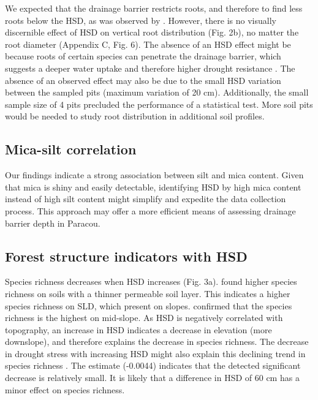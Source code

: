 \documentclass[fleqn,11pt]{latex/stylish_article} %
\begin{document}
We expected that the drainage barrier restricts roots, and therefore to find less roots below the HSD, as was observed by \citet{humbelCaracterisationParMesures1978}. However, there is no visually discernible effect of HSD on vertical root distribution (Fig. 2b), no matter the root diameter (Appendix C, Fig. 6). The absence of an HSD effect might be because roots of certain species can penetrate the drainage barrier, which suggests a deeper water uptake and therefore higher drought resistance \citep{ferryGeneseFonctionnementHydrique2003}. The absence of an observed effect may also be due to the small HSD variation between the sampled pits (maximum variation of 20 cm). Additionally, the small sample size of 4 pits precluded the performance of a statistical test. More soil pits would be needed to study root distribution in additional soil profiles.

\hypertarget{mica-silt-correlation}{%
\subsection{Mica-silt correlation}\label{mica-silt-correlation}}

Our findings indicate a strong association between silt and mica content. Given that mica is shiny and easily detectable, identifying HSD by high mica content instead of high silt content might simplify and expedite the data collection process. This approach may offer a more efficient means of assessing drainage barrier depth in Paracou.

\hypertarget{forest-structure-indicators-with-hsd}{%
\subsection{Forest structure indicators with HSD}\label{forest-structure-indicators-with-hsd}}

Species richness decreases when HSD increases (Fig. 3a). \citet{sabatierInfluenceSoilCover1997} found higher species richness on soils with a thinner permeable soil layer. This indicates a higher species richness on SLD, which present on slopes. \citet{alliePervasiveLocalScaleTreeSoil2015} confirmed that the species richness is the highest on mid-slope. As HSD is negatively correlated with topography, an increase in HSD indicates a decrease in elevation (more downslope), and therefore explains the decrease in species richness. The decrease in drought stress with increasing HSD might also explain this declining trend in species richness \citep{sabatierInfluenceSoilCover1997}. The estimate (-0.0044) indicates that the detected significant decrease is relatively small. It is likely that a difference in HSD of 60 cm has a minor effect on species richness.
\end{document}
